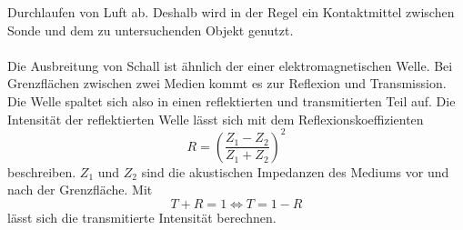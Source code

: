 Durchlaufen von Luft ab. Deshalb wird in der Regel ein Kontaktmittel zwischen Sonde und dem zu untersuchenden Objekt genutzt.\\
\\
Die Ausbreitung von Schall ist ähnlich der einer elektromagnetischen Welle. Bei Grenzflächen zwischen zwei Medien kommt es zur Reflexion und Transmission. Die Welle spaltet 
sich also in einen reflektierten und transmitierten Teil auf. Die Intensität der reflektierten Welle lässt sich mit dem Reflexionskoeffizienten
\begin{equation*}
    R = (\frac{Z_1 - Z_2}{Z_1 + Z_2})^2
\end{equation*}
beschreiben. $Z_1$ und $Z_2$ sind die akustischen Impedanzen des Mediums vor und nach der Grenzfläche. Mit 
\begin{equation*}
    T + R = 1 \Leftrightarrow T = 1 - R
\end{equation*}
lässt sich die transmitierte Intensität berechnen.